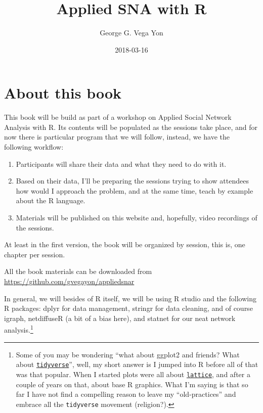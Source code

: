 \documentclass[]{book}
\title{Applied SNA with R}
\author{George G. Vega Yon}
\date{2018-03-16}
\let\rmarkdownfootnote\footnote%
\def\footnote{\protect\rmarkdownfootnote}
\theoremstyle{definition}
\theoremstyle{definition}
\theoremstyle{definition}
\theoremstyle{remark}
\begin{document}
\maketitle

{
\setcounter{tocdepth}{1}
\tableofcontents
}
\renewcommand{\Pr}[1]{\mbox{Pr}\left(#1\right)}
\renewcommand{\exp}[1]{\mbox{exp}\left\{#1\right\}}

\chapter{About this book}\label{about-this-book}

This book will be build as part of a workshop on Applied Social Network
Analysis with R. Its contents will be populated as the sessions take
place, and for now there is particular program that we will follow,
instead, we have the following workflow:

\begin{enumerate}
\def\labelenumi{\arabic{enumi}.}
\item
  Participants will share their data and what they need to do with it.
\item
  Based on their data, I'll be preparing the sessions trying to show
  attendees how would I approach the problem, and at the same time,
  teach by example about the R language.
\item
  Materials will be published on this website and, hopefully, video
  recordings of the sessions.
\end{enumerate}

At least in the first version, the book will be organized by session,
this is, one chapter per session.

All the book materials can be downloaded from
\url{https://github.com/gvegayon/appliedsnar}

In general, we will besides of R itself, we will be using R studio and
the following R packages: dplyr for data management, stringr for data
cleaning, and of course igraph, netdiffuseR (a bit of a bias here), and
statnet for our neat network analysis.\footnote{Some of you may be
  wondering ``what about ggplot2 and friends? What about
  \href{https://www.tidyverse.org/}{\texttt{tidyverse}}'', well, my
  short answer is I jumped into R before all of that was that popular.
  When I started plots were all about
  \href{https://CRAN.R-project.org/package=lattice}{\texttt{lattice}},
  and after a couple of years on that, about base R graphics. What I'm
  saying is that so far I have not find a compelling reason to leave my
  ``old-practices'' and embrace all the \texttt{tidyverse} movement
  (religion?).}
\end{document}
